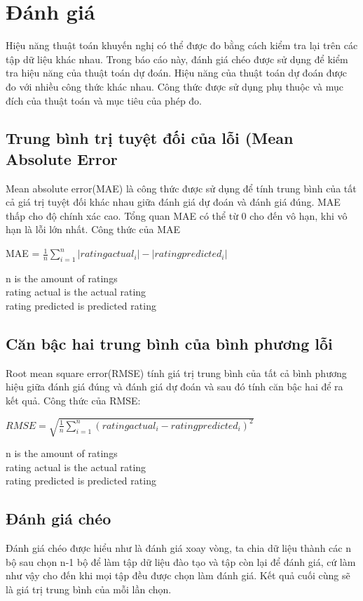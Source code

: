 \section{Đánh giá}
Hiệu năng thuật toán khuyến nghị có thể được đo bằng cách kiểm tra lại trên các tập dữ liệu khác nhau. Trong báo cáo này, đánh giá chéo được sử dụng để kiểm tra hiệu năng của thuật toán dự đoán. Hiệu năng của thuật toán dự đoán được đo với nhiều công thức khác nhau. Công thức được sử dụng phụ thuộc và mục đích của thuật toán và mục tiêu của phép đo.
\subsection{Trung bình trị tuyệt đối của lỗi (Mean Absolute Error}
Mean absolute error(MAE) là công thức được sử dụng để tính trung bình của tất cả giá trị tuyệt đối khác nhau giữa đánh giá dự đoán và đánh giá đúng. MAE thấp cho độ chính xác cao. Tổng quan MAE có thể từ 0 cho đến vô hạn, khi vô hạn là lỗi lớn nhất. Công thức của MAE 
\begin{center}
MAE = $ \frac{1}{n}\sum^{n}_{i=1}|ratingactual_{i}| - |ratingpredicted_{i}|$
\end{center}
n is the amount of ratings
\\ rating\- actual is the actual rating
\\ rating\- predicted is predicted rating
\subsection{Căn bậc hai trung bình của bình phương lỗi}
Root mean square error(RMSE) tính giá trị trung bình của tất cả bình phương hiệu giữa đánh giá đúng và đánh giá dự đoán và sau đó tính căn bậc hai để ra kết quả. Công thức của RMSE:
\begin{center}
$RMSE = \sqrt{\frac{1}{n}\sum^{n}_{i=1}(ratingactual_{i} - ratingpredicted_{i})^2}$
\end{center}
n is the amount of ratings
\\ rating\- actual is the actual rating
\\ rating\- predicted is predicted rating

\subsection{Đánh giá chéo}
Đánh giá chéo được hiểu như là đánh giá xoay vòng, ta chia dữ liệu thành các n bộ sau chọn n-1 bộ để làm tập dữ liệu đào tạo và tập còn lại để đánh giá, cứ làm như vậy cho đến khi mọi tập đều được chọn làm đánh giá. Kết quả cuối cùng sẽ là giá trị trung bình của mỗi lần chọn.
